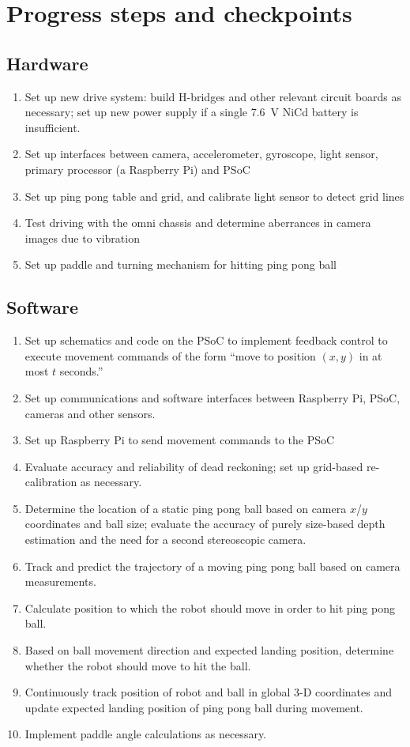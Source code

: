 \documentclass[letterpaper, 11pt]{article}
\begin{document}
\clearpage
\section{Progress steps and checkpoints}
\subsection*{Hardware}
\begin{enumerate}
    \item Set up new drive system: build H-bridges and other relevant circuit boards as necessary; set up new power supply if a single 7.6~V NiCd battery is insufficient.
    \item Set up interfaces between camera, accelerometer, gyroscope, light sensor, primary processor (a Raspberry Pi) and PSoC
    \item Set up ping pong table and grid, and calibrate light sensor to detect grid lines
    \item Test driving with the omni chassis and determine aberrances in camera images due to vibration
    \item Set up paddle and turning mechanism for hitting ping pong ball
\end{enumerate}

\subsection*{Software}
\begin{enumerate}
    \item Set up schematics and code on the PSoC to implement feedback control to execute movement commands of the form ``move to position $(x, y)$ in at most $t$ seconds.''
    \item Set up communications and software interfaces between Raspberry Pi, PSoC, cameras and other sensors.
    \item Set up Raspberry Pi to send movement commands to the PSoC
    \item Evaluate accuracy and reliability of dead reckoning; set up grid-based re-calibration as necessary.
    \item Determine the location of a static ping pong ball based on camera $x$/$y$ coordinates and ball size; evaluate the accuracy of purely size-based depth estimation and the need for a second stereoscopic camera.
    \item Track and predict the trajectory of a moving ping pong ball based on camera measurements.
    \item Calculate position to which the robot should move in order to hit ping pong ball.
    \item Based on ball movement direction and expected landing position, determine whether the robot should move to hit the ball.
    \item Continuously track position of robot and ball in global 3-D coordinates and update expected landing position of ping pong ball during movement.
    \item Implement paddle angle calculations as necessary.
\end{enumerate}
\end{document}
